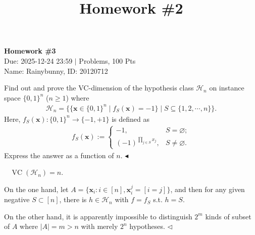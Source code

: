 ﻿\documentclass[11pt]{article}
\title{Homework \#2}
\newenvironment{problem}[2][Problem]{\begin{trivlist}
\item[\hskip \labelsep {\bfseries #1}\hskip \labelsep {\bfseries #2.}]}{\hfill$\blacktriangleleft$\end{trivlist}}
\newenvironment{answer}[1][Answer]{\begin{trivlist}
\item[\hskip \labelsep {\bfseries #1.}\hskip \labelsep]}{\hfill$\lhd$\end{trivlist}}
\begin{document}
\pagestyle{fancy}
\chead{}

\begin{center}
    {\LARGE \bf Homework \#3}\\
    {Due: 2025-12-24 23:59 \quad$|$ Problems, 100 Pts}\\
    {Name: Rainybunny, ID: 20120712}            %
\end{center}

\begin{problem}{1 (15')}
Find out and prove the VC-dimension of the hypothesis class $\mathcal{H}_n$ on instance space $\{0,1\}^n$ ($n\geq 1$) where
\begin{align*}
    \mathcal{H}_n=\{\{\bm x\in \{0,1\}^n \mid f_S(\bm x)=-1\}\mid S\subseteq \{1,2,\cdots,n\}\}.
\end{align*}
Here, $f_S(\bm x): \{0,1\}^n\to\{-1,+1\}$ is defined as
\begin{align*}
    f_S(\bm x) := \begin{cases}
        -1,  & S = \varnothing; \\ 
        (-1)^{\prod_{j\in S}x_j}, &  S \ne \varnothing.
    \end{cases}
\end{align*}
Express the answer as a function of $n$.
\end{problem}

\begin{answer} ~
    $\operatorname{VC}(\mathcal{H}_n)=n$.

    On the one hand, let $A=\{\bm x_i:i\in[n],\bm x_i^j=[i=j]\}$, and then for any given negative
    $S\subset[n]$, there is $h\in\mathcal{H}_n$ with $f=f_S$ s.t. $h=S$.

    On the other hand, it is apparently impossible to distinguish $2^{m}$ kinds of subset of $A$ where $|A|=m>n$ with merely $2^n$ hypotheses.
\end{answer}
\end{document}
